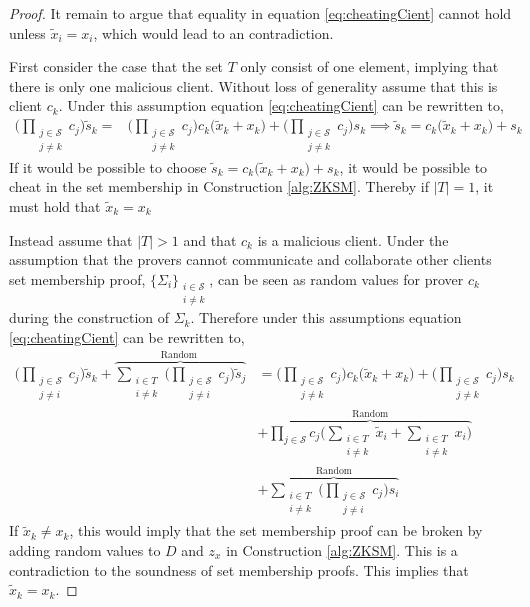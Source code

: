 \begin{proof}
It remain to argue that equality in equation \eqref{eq:cheatingCient} cannot hold unless $\tilde{x}_i= x_i$, which would lead to an contradiction. 

First consider the case that the set $T$ only consist of one element, implying that there is only one malicious client. Without loss of generality assume that this is client $c_k$. Under this assumption equation \eqref{eq:cheatingCient} can be rewritten to, 
\begin{align*}
\big(\prod_{\substack{j\in\mathcal{S}\\ j\neq k}} c_j \big)  \tilde{s}_k  =& \big ( \prod_{\substack{j\in\mathcal{S}\\ j\neq k}} c_j \big)c_k \big( \tilde{x}_k + x_k\big) +\big( \prod_{\substack{j\in\mathcal{S}\\ j\neq k}} c_j\big) s_k  \implies   \tilde{s}_k  = c_k \big( \tilde{x}_k + x_k\big) + s_k
\end{align*}
If it would be possible to choose $\tilde{s}_k = c_k \big( \tilde{x}_k + x_k\big) + s_k $, it would be possible to cheat in the set membership in Construction \ref{alg:ZKSM}. Thereby if $|T|=1$, it must hold that $\tilde{x}_k=x_k$

Instead assume that $|T|>1$ and that $c_k$ is a malicious client. Under the assumption that the provers cannot communicate and collaborate other clients set membership proof, $\{\Sigma_i\}_{\substack{i\in\mathcal{S}\\ i\neq k}}$, can be seen as random values for prover $c_k$ during the construction of $\Sigma_k$. Therefore under this assumptions equation \eqref{eq:cheatingCient} can be rewritten to, 
\begin{align*}
\big(\prod_{\substack{j\in\mathcal{S}\\ j\neq i}} c_j \big) \tilde{s}_k +  \overbrace{\sum_{\substack{i\in T \\ i\neq k}} \big(\prod_{\substack{j\in\mathcal{S}\\ j\neq i}} c_j \big) \tilde{s}_j}^{\text{Random }}  &=
  \big ( \prod_{\substack{j\in\mathcal{S}\\ j\neq k}} c_j \big)c_k \big( \tilde{x}_k + x_k\big) +\big( \prod_{\substack{j\in\mathcal{S}\\ j\neq k}} c_j\big) s_k 
  \\ 
   &+ \overbrace{\prod_{j\in\mathcal{S}} c_j \big(\sum_{\substack{i\in T \\ i\neq k}} \tilde{x}_i + \sum_{\substack{i\in T \\ i\neq k}} x_i\big)}^{\text{Random}} \\
   & + \overbrace{\sum_{\substack{i\in T \\ i\neq k}} \big( \prod_{\substack{j\in\mathcal{S}\\ j\neq i}} c_j\big) s_i  }^{\text{Random}}
\end{align*}
If $\tilde{x}_k \neq x_k$, this would imply that the set membership proof can be broken by adding random values to $D$ and $z_x$ in Construction \ref{alg:ZKSM}. This is a contradiction to the soundness of set membership proofs. This implies that $\tilde{x}_k=x_k$. 


\end{proof}
